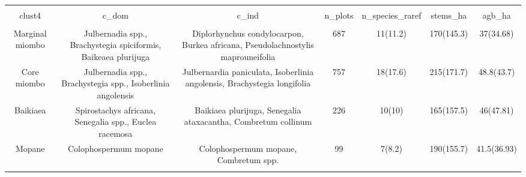 
\begin{table}[!htbp] \centering 
  \caption{} 
  \label{clust_summ} 
\begin{tabular}{@{\extracolsep{5pt}} ccccccc} 
\\[-1.8ex]\hline 
\hline \\[-1.8ex] 
clust4 & c\_dom & c\_ind & n\_plots & n\_species\_raref & stems\_ha & agb\_ha \\ 
\hline \\[-1.8ex] 
Marginal miombo & Julbernadia spp., Brachystegia spiciformis, Baikeaea plurijuga & Diplorhynchus condylocarpon, Burkea africana, Pseudolachnostylis maprouneifolia & 687 & 11(11.2) & 170(145.3) & 37(34.68) \\ 
Core miombo & Julbernadia spp., Brachystegia spp., Isoberlinia angolensis & Julbernardia paniculata, Isoberlinia angolensis, Brachystegia longifolia & 757 & 18(17.6) & 215(171.7) & 48.8(43.7) \\ 
Baikiaea & Spirostachys africana, Senegalia spp., Euclea racemosa & Baikiaea plurijuga, Senegalia ataxacantha, Combretum collinum & 226 & 10(10) & 165(157.5) & 46(47.81) \\ 
Mopane & Colophospermum mopane & Colophospermum mopane, Combretum spp. & 99 & 7(8.2) & 190(155.7) & 41.5(36.93) \\ 
\hline \\[-1.8ex] 
\end{tabular} 
\end{table} 
